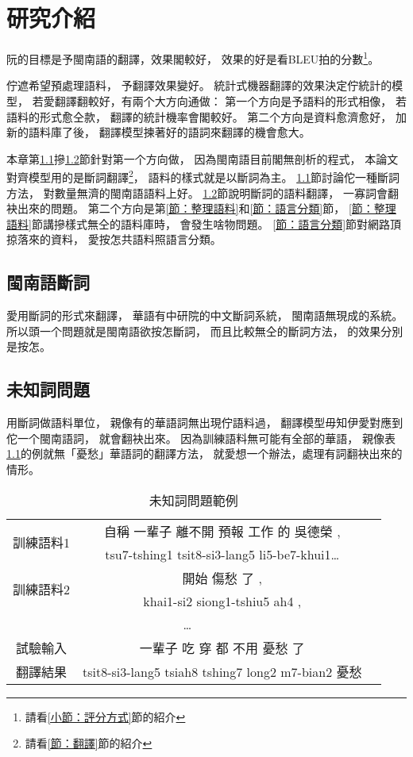 \chapter{研究介紹}
\label{章：研究介紹}

阮的目標是予閩南語的翻譯，效果閣較好，
效果的好是看BLEU拍的分數\footnote{請看\ref{小節：評分方式}節的紹介}。

佇遮希望預處理語料，
予翻譯效果變好。
統計式機器翻譯的效果決定佇統計的模型，
若愛翻譯翻較好，有兩个大方向通做：
第一个方向是予語料的形式相像，
若語料的形式愈仝款，
翻譯的統計機率會閣較好。
第二个方向是資料愈濟愈好，
加新的語料庫了後，
翻譯模型揀著好的語詞來翻譯的機會愈大。

本章第\ref{節：閩南語斷詞}摻\ref{節：未知詞問題}節針對第一个方向做，
因為閩南語目前閣無剖析的程式，
本論文對齊模型用的是斷詞翻譯\footnote{請看\ref{節：翻譯}節的紹介}，
語料的樣式就是以斷詞為主。
\ref{節：閩南語斷詞}節討論佗一種斷詞方法，
對數量無濟的閩南語語料上好。
\ref{節：未知詞問題}節說明斷詞的語料翻譯，
一寡詞會翻袂出來的問題。
第二个方向是第\ref{節：整理語料}和\ref{節：語言分類}節，
\ref{節：整理語料}節講摻樣式無仝的語料庫時，
會發生啥物問題。
\ref{節：語言分類}節對網路頂掠落來的資料，
愛按怎共語料照語言分類。

\section{閩南語斷詞}
\label{節：閩南語斷詞}
愛用斷詞的形式來翻譯，
華語有中研院的中文斷詞系統，
閩南語無現成的系統。
所以頭一个問題就是閩南語欲按怎斷詞，
而且比較無仝的斷詞方法，
的效果分別是按怎。

\section{未知詞問題}
\label{節：未知詞問題}
用斷詞做語料單位，
親像有的華語詞無出現佇語料過，
翻譯模型毋知伊愛對應到佗一个閩南語詞，
就會翻袂出來。
因為訓練語料無可能有全部的華語，
親像表\ref{表：未知詞問題範例}的例就無「憂愁」華語詞的翻譯方法，
就愛想一个辦法，處理有詞翻袂出來的情形。


\begin{table}
\caption{未知詞問題範例}
\label{表：未知詞問題範例}
\centering
\begin{tabular}{ccc}
\hline
\multirow{2}{*}{訓練語料1} & 自稱 一輩子 離不開 預報 工作 的 吳德榮 , \\
 & tsu7-tshing1 tsit8-si3-lang5 li5-be7-khui1… \\
\hline
\multirow{2}{*}{訓練語料2} & 開始 傷愁 了 , \\
 & khai1-si2 siong1-tshiu5 ah4 , \\
\hline
\multicolumn{2}{c}{…} \\
\hline
\hline
試驗輸入 & 一輩子 吃 穿 都 不用 憂愁 了 \\
翻譯結果 & tsit8-si3-lang5 tsiah8 tshing7 long2 m7-bian2 憂愁 \\
\hline
\end{tabular}
\end{table}

